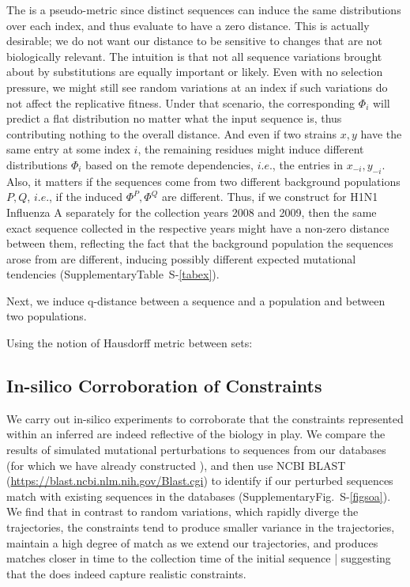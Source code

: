 \documentclass[onecolumn, compsoc,10pt]{IEEEtran}
\def\SUPPLEMENTARY{Supplementary}
\begin{document}
The \qdist is a pseudo-metric since  distinct sequences can induce the same distributions over each index, and thus evaluate to have a zero distance. This is  actually desirable; we do not want our distance to be  sensitive to changes that are not biologically relevant. The intuition is that  not all sequence variations brought about by substitutions are equally important or likely. Even with no  selection pressure, we might still see random  variations at an index if such variations do not affect the replicative fitness. Under that scenario, the corresponding $\Phi_i$ will predict a flat distribution no matter what the input sequence is, thus contributing nothing to the overall distance. And even if two strains $x,y$ have the same entry at some index $i$, the remaining residues  might induce different distributions $\Phi_i$ based on the remote dependencies, $i.e.$, the entries in $x_{-i},y_{-i}$. Also, it matters if the sequences come from two different background populations $P,Q$, $i.e.$, if the induced  $\Phi^P,\Phi^Q$ are different. Thus, if we construct  for H1N1 Influenza A separately for the collection years 2008 and 2009, then the same exact sequence collected in the respective years might have a non-zero distance between them, reflecting the fact that the background population the sequences arose from are different, inducing possibly different expected mutational tendencies (\SUPPLEMENTARY Table~S-\ref{tabex}).

Next, we induce q-distance  between a sequence and a population and between two populations.
\begin{defn}
Using the notion of Hausdorff metric between sets:
\end{defn}

\subsection*{In-silico Corroboration of \enet Constraints}

We carry out in-silico experiments to corroborate that the constraints represented within an inferred \enet are indeed reflective of the  biology in play. We compare the results of simulated mutational perturbations to sequences from our databases (for which we have already constructed ), and then use NCBI BLAST (\href{https://blast.ncbi.nlm.nih.gov/Blast.cgi}{https://blast.ncbi.nlm.nih.gov/Blast.cgi}) to identify  if  our perturbed sequences match with existing sequences in the databases (\SUPPLEMENTARY Fig.~S-\ref{figsoa}). We find that in contrast to random variations, which rapidly diverge the trajectories, the \enet constraints tend to produce smaller variance in the trajectories, maintain a high degree of match as we extend our trajectories, and produces matches closer in time to the collection time of the  initial sequence | suggesting that the \enet  does indeed capture realistic constraints.
\end{document}
